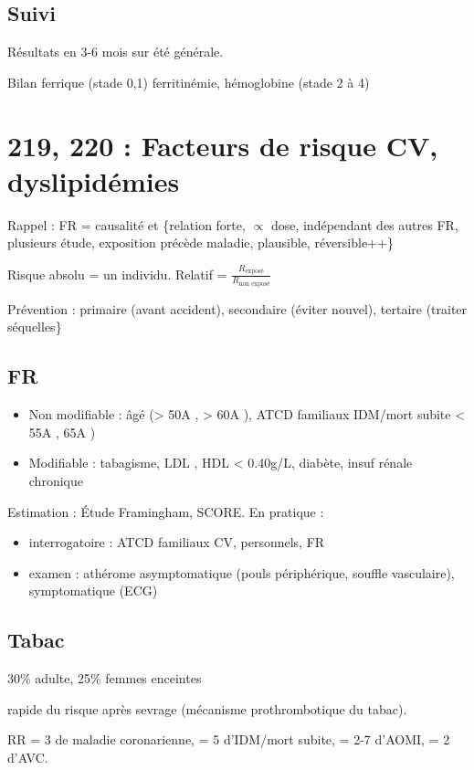 \documentclass[11pt]{article}
\begin{document}
\subsection{Suivi}
\label{sec:orga61d480}
Résultats en 3-6 mois sur été générale. 

Bilan ferrique (stade 0,1) ferritinémie, hémoglobine (stade 2 à 4)

\section{219, 220 :  Facteurs de risque CV, dyslipidémies}
\label{sec:org6ff454f}
Rappel : FR = causalité et \{relation forte, \(\propto\) dose, indépendant des autres
FR, plusieurs étude, exposition précède maladie, plausible, réversible++\}

Risque absolu = un individu. Relatif = \(\frac{R_{\text{exposé}}}{R_{\text{non exposé}}}\)

Prévention : primaire (avant accident), secondaire (éviter nouvel), tertaire
(traiter séquelles\}

\subsection{FR}
\label{sec:org645f940}
\begin{itemize}
\item Non modifiable : âgé (> 50A \male, > 60A \female), ATCD familiaux IDM/mort
subite < 55A \male, 65A \female)
\item Modifiable : tabagisme, LDL \inc, HDL < 0.40g/L, diabète, insuf rénale
chronique
\end{itemize}

Estimation : Étude Framingham, SCORE. En pratique : 
\begin{itemize}
\item interrogatoire  : ATCD familiaux CV, personnels, FR
\item examen : athérome asymptomatique (pouls périphérique, souffle vasculaire),
symptomatique (ECG)
\end{itemize}

\subsection{Tabac}
\label{sec:org41d01e2}
30\% adulte, 25\% femmes enceintes

\inc rapide du risque après sevrage (mécanisme prothrombotique du tabac). 

RR = 3 de maladie coronarienne, = 5 d'IDM/mort subite, = 2-7 d'AOMI, = 2 d'AVC.
\end{document}
